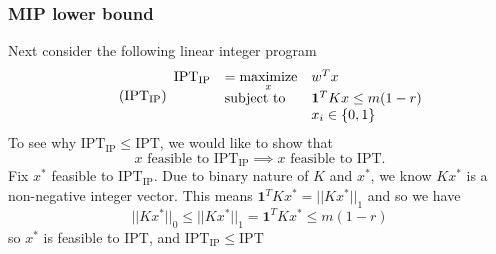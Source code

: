 \documentclass[12pt]{article}
\newcommand{\priv}{\text{IPT}}
\newcommand{\privlip}{\text{IPT}_\text{IP}}
\begin{document}
\subsubsection{\gls{MIP} lower bound}
Next consider the following linear integer program
\begin{equation}
	\label{eq:privlip} 
    \tag{$\privlip$} 
	\begin{array}{lll}
		\privlip & = \underset{x}{\text{maximize}} & w^T x \\
		&\mbox{subject to} & \mathbf{1}^TKx \leq m(1-r) \\
        && x_i\in \{0,1\}
		\end{array}
\end{equation}
To see why $\privlip \leq \priv$, we would like to show that 
\[x \text{ feasible to } \privlip \implies x \text{ feasible to } \priv.\]
Fix $x^*$ feasible to $\privlip$. Due to binary nature of $K$ and $x^*$, we know $Kx^*$ is a non-negative integer vector. This means $\mathbf{1}^TKx^* = ||Kx^*||_1$ and so we have \[ ||Kx^*||_0 \leq ||Kx^*||_1 = \mathbf{1}^T K x^* \leq m(1-r)\]
so $x^*$ is feasible to $\priv$, and $\privlip \leq \priv$
\end{document}
